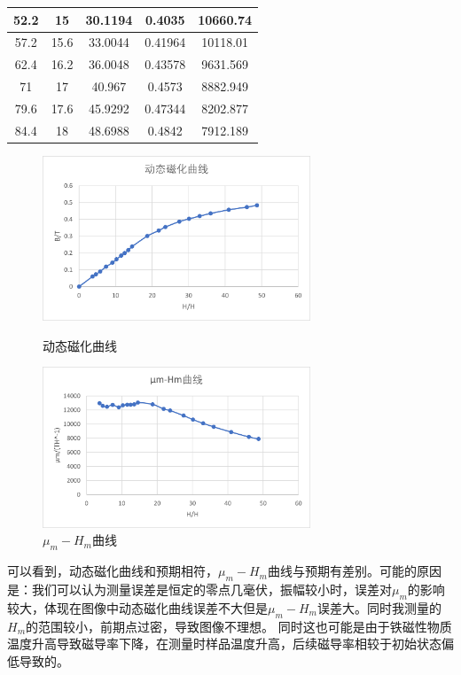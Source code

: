 \documentclass[11pt]{article}
\begin{document}
\begin{enumerate}
\begin{table}[H]
\begin{tabular}{|c|c|c|c|c|}
            52.2   & 15     & 30.1194 & 0.4035 & 10660.74 \\\hline
            57.2   & 15.6   & 33.0044 & 0.41964 & 10118.01 \\\hline
            62.4   & 16.2   & 36.0048 & 0.43578 & 9631.569 \\\hline
            71     & 17     & 40.967 & 0.4573 & 8882.949 \\\hline
            79.6   & 17.6   & 45.9292 & 0.47344 & 8202.877 \\\hline
            84.4   & 18     & 48.6988 & 0.4842 & 7912.189 \\\hline
            \end{tabular}%
          \label{tab:动态磁化1}%
        \end{table}%
        \begin{figure}[H]
            \centering
            \begin{minipage}[t]{0.49\linewidth}
                \centering
                \includegraphics[width=8cm]{Fig/6.png}
                \caption{动态磁化曲线}
            \end{minipage}
            \begin{minipage}[t]{0.49\linewidth}
                \centering
                \includegraphics[width=8cm]{Fig/7.png}
                \caption{$\mu_m - H_m$曲线}
            \end{minipage}
            
        \end{figure}
        
        \hspace*{2em}可以看到，动态磁化曲线和预期相符，$\mu_m - H_m$曲线与预期有差别。可能的原因是：我们可以认为测量误差是恒定的零点几毫伏，振幅较小时，误差对$\mu_m$的影响较大，体现在图像中动态磁化曲线误差不大但是$\mu_m - H_m$误差大。同时我测量的$H_m$的范围较小，前期点过密，导致图像不理想。
        \newline \hspace*{2em} 同时这也可能是由于铁磁性物质温度升高导致磁导率下降，在测量时样品温度升高，后续磁导率相较于初始状态偏低导致的。

\end{enumerate}
\end{document}
